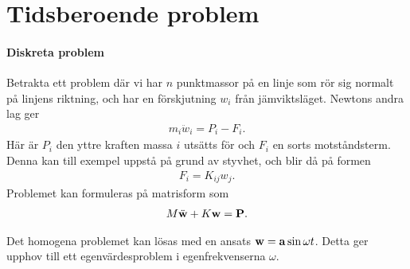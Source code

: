 \section{Tidsberoende problem}

\paragraph{Diskreta problem}
Betrakta ett problem där vi har $n$ punktmassor på en linje som rör sig normalt på linjens riktning, och har en förskjutning $w_{i}$ från jämviktsläget. Newtons andra lag ger
\begin{align*}
	m_{i}\ddot{w}_{i} = P_{i} - F_{i}.
\end{align*}
Här är $P_{i}$ den yttre kraften massa $i$ utsätts för och $F_{i}$ en sorts motståndsterm. Denna kan till exempel uppstå på grund av styvhet, och blir då på formen
\begin{align*}
	F_{i} = K_{ij}w_{j}.
\end{align*}
Problemet kan formuleras på matrisform som
\begin{align*}
	M\ddot{\vb{w}} + K\vb{w} = \vb{P}.
\end{align*}

Det homogena problemet kan lösas med en ansats $\vb{w} = \vb{a}\sin{\omega t}$. Detta ger upphov till ett egenvärdesproblem i egenfrekvenserna $\omega$.